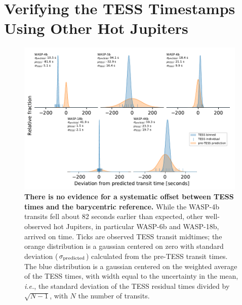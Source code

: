 \documentclass[12pt,twocolumn,tighten]{aastex62}
\begin{document}






\clearpage

                            
 


\appendix

\section{Verifying the TESS Timestamps Using Other Hot Jupiters}
\label{sec:verify_tess}

\begin{figure}[t!]
	\begin{center}
		\leavevmode
		\includegraphics[width=0.98\textwidth]{f7.pdf}
	\end{center}
	\vspace{-0.5cm}
	\caption{
		{\bf There is no evidence for a systematic offset between TESS
			times and the barycentric reference.} While the WASP-4b transits
		fell about 82 seconds earlier than expected, other well-observed
		hot Jupiters, in particular WASP-6b and WASP-18b, arrived on time.
		Ticks are observed TESS transit midtimes; the orange distribution
		is a gaussian centered on zero with standard deviation
		($\sigma_{\rm predicted}$) calculated from the pre-TESS transit
		times.  The blue distribution is a gaussian centered on the
		weighted average of the TESS times, with width equal to the
		uncertainty in the mean, {\it i.e.}, the standard deviation
		of the TESS residual times divided by $\sqrt{N-1}$, with $N$ the
		number of transits.
		\label{fig:hjs}
	}
\end{figure}
\end{document}
